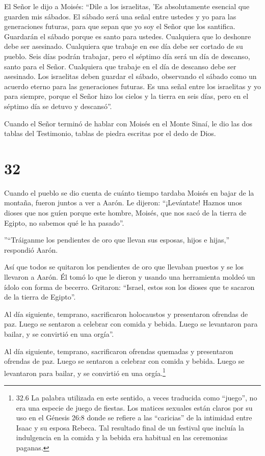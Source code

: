  El Señor le dijo a Moisés:  ``Dile a los
israelitas, 'Es absolutamente esencial que guarden mis sábados. El
sábado será una señal entre ustedes y yo para las generaciones futuras,
para que sepan que yo soy el Señor que los santifica. 
Guardarán el sábado porque es santo para ustedes. Cualquiera que lo
deshonre debe ser asesinado. Cualquiera que trabaje en ese día debe ser
cortado de su pueblo.  Seis días podrán trabajar, pero el
séptimo día será un día de descanso, santo para el Señor. Cualquiera que
trabaje en el día de descanso debe ser asesinado.  Los
israelitas deben guardar el sábado, observando el sábado como un acuerdo
eterno para las generaciones futuras.  Es una señal entre
los israelitas y yo para siempre, porque el Señor hizo los cielos y la
tierra en seis días, pero en el séptimo día se detuvo y descansó''.

 Cuando el Señor terminó de hablar con Moisés en el Monte
Sinaí, le dio las dos tablas del Testimonio, tablas de piedra escritas
por el dedo de Dios.

\hypertarget{section-31}{%
\section{32}\label{section-31}}

 Cuando el pueblo se dio cuenta de cuánto tiempo tardaba
Moisés en bajar de la montaña, fueron juntos a ver a Aarón. Le dijeron:
``¡Levántate! Haznos unos dioses que nos guíen porque este hombre,
Moisés, que nos sacó de la tierra de Egipto, no sabemos qué le ha
pasado''.

 ''``Tráiganme los pendientes de oro que llevan sus esposas,
hijos e hijas,'' respondió Aarón.

 Así que todos se quitaron los pendientes de oro que
llevaban puestos y se los llevaron a Aarón.  Él tomó lo que
le dieron y usando una herramienta moldeó un ídolo con forma de becerro.
Gritaron: ``Israel, estos son los dioses que te sacaron de la tierra de
Egipto''.

 Al día siguiente, temprano, sacrificaron holocaustos y
presentaron ofrendas de paz. Luego se sentaron a celebrar con comida y
bebida. Luego se levantaron para bailar, y se convirtió en una orgía''.

 Al día siguiente, temprano, sacrificaron ofrendas quemadas
y presentaron ofrendas de paz. Luego se sentaron a celebrar con comida y
bebida. Luego se levantaron para bailar, y se convirtió en una
orgía.\footnote{32.6 La palabra utilizada en este sentido, a veces
  traducida como ``juego'', no era una especie de juego de fiestas. Los
  matices sexuales están claros por su uso en el Génesis 26:8 donde se
  refiere a las ``caricias'' de la intimidad entre Isaac y su esposa
  Rebeca. Tal resultado final de un festival que incluía la indulgencia
  en la comida y la bebida era habitual en las ceremonias paganas.}

